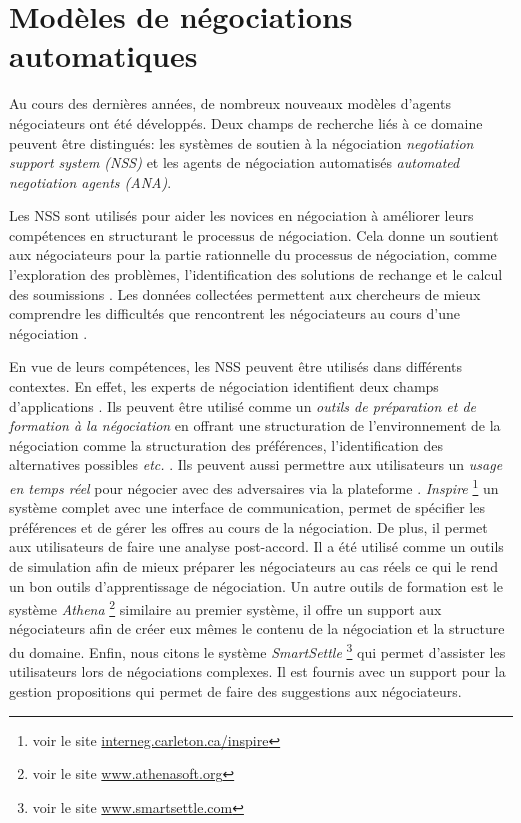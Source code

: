 	
	


	\section{Modèles de négociations automatiques}
	
	Au cours des dernières années, de nombreux nouveaux modèles d'agents négociateurs ont été développés. Deux champs de recherche liés à ce domaine peuvent être distingués: les systèmes de soutien à la négociation \emph{ negotiation support system (NSS)} et les agents de négociation automatisés \emph{automated negotiation agents (ANA)}.
	

	 Les NSS sont utilisés pour aider les novices en négociation à améliorer leurs compétences en structurant le processus de négociation. Cela donne un soutient aux négociateurs pour la partie rationnelle du processus de négociation, comme l'exploration des problèmes, l'identification des solutions de rechange et le calcul des soumissions \cite{hindriks2008creating}. Les données collectées permettent aux chercheurs de mieux comprendre les difficultés que rencontrent les négociateurs au cours d'une négociation \cite{jonker2012negotiating}. 
	 
	 En vue de leurs compétences, les NSS peuvent être utilisés dans différents contextes. En effet, les experts de négociation identifient deux champs d'applications \cite{pommeranz2009design}. Ils peuvent être utilisé comme un \textit{outils de préparation et de formation à la négociation} en offrant une structuration de l'environnement de la négociation comme la structuration des préférences, l'identification des alternatives possibles \emph{etc.} \cite{broekens2010affective}.  Ils peuvent aussi permettre aux utilisateurs un \textit{usage en temps réel} pour négocier avec des adversaires via la plateforme \cite{pommeranz2009design}. 
	 \emph{Inspire} \footnote{ voir le site \url{interneg.carleton.ca/inspire}} un système complet avec une interface de communication, permet de spécifier les préférences et de gérer les offres au cours de la négociation. De plus, il permet aux utilisateurs de faire une analyse post-accord. 
	 Il a été utilisé comme  un outils de simulation afin de mieux préparer les négociateurs au cas réels ce qui le rend un bon outils d'apprentissage de négociation. Un autre outils de formation est le système \emph{Athena} \footnote{ voir le site \url{www.athenasoft.org}} similaire au premier système, il offre un support aux négociateurs afin de créer eux mêmes le contenu de la négociation et la structure du domaine. Enfin, nous citons le système \emph{SmartSettle} \footnote{ voir le site \url{www.smartsettle.com}} qui permet d'assister les utilisateurs lors de négociations complexes. Il est fournis avec un support pour la gestion propositions qui permet de faire des suggestions aux négociateurs. 
	  
